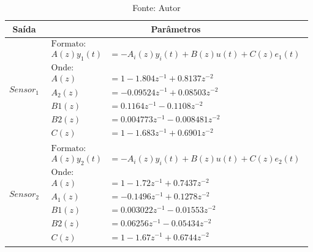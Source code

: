 \begin{table}[h]
	\centering
	\caption{Melhor modelo experimental - ARMAX}
	\label{tab:tclabsp-model-armax}
	\begin{tabular}{c|c} \toprule
		{Saída}			&	{Parâmetros}									\\ \midrule
		$Sensor_1$			&
								$ 
									\begin{aligned}
										\text{Formato:}													\\
										A(z)y_1(t) &= - A_i(z)y_i(t) + B(z)u(t) + C(z)e_1(t)			\\
										\text{Onde:}													\\
										A(z) &= 1 - 1.804 z^{-1} + 0.8137 z^{-2}      					\\
										A_2(z) &= -0.09524 z^{-1} + 0.08503 z^{-2}  					\\							
										B1(z) &= 0.1164 z^{-1} - 0.1108 z^{-2}     						\\				
										B2(z) &= 0.004773 z^{-1} - 0.008481 z^{-2} 						\\				
										C(z) &= 1 - 1.683 z^{-1} + 0.6901 z^{-2}    
									\end{aligned}
								$	
							\\ \midrule
		$Sensor_2$			&
								$ 
									\begin{aligned}
										\text{Formato:}													\\
										A(z)y_2(t) &= - A_i(z)y_i(t) + B(z)u(t) + C(z)e_2(t)			\\
										\text{Onde:}													\\
										A(z) &= 1 - 1.72 z^{-1} + 0.7437 z^{-2}       					\\
										A_1(z) &= -0.1496 z^{-1} + 0.1278 z^{-2}   						\\				
										B1(z) &= 0.003022 z^{-1} - 0.01553 z^{-2} 						\\				
										B2(z) &= 0.06256 z^{-1} - 0.05434 z^{-2}  						\\				
										C(z) &= 1 - 1.67 z^{-1} + 0.6744 z^{-2}     			
									\end{aligned}
								$
							\\ \bottomrule
	\end{tabular}
	\caption*{Fonte: Autor}
\end{table}

